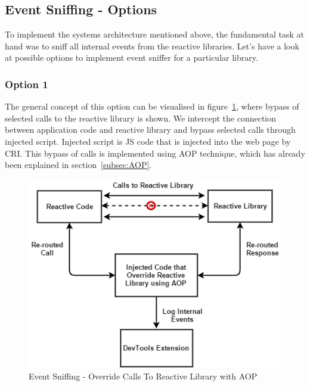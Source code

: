 \subsection{Event Sniffing - Options}
To implement the systems architecture mentioned above, the fundamental task at hand was to sniff all internal events from the reactive libraries. Let's have a look at possible options to implement event sniffer for a particular library.

\subsubsection{Option 1}
The general concept of this option can be visualised in figure~\ref{fig:event_sniffing_1}, where bypass of selected calls to the reactive library is shown. 
We intercept the connection between application code and reactive library and bypass selected calls through injected script. Injected script is JS code that is injected into the web page by CRI. 
This bypass of calls is implemented using AOP technique, which has already been explained in section~\ref{subsec:AOP}.



\begin{figure}[!h]
	\centering
	\includegraphics[scale=0.5,trim=0 0 0 0]{gfx/EventSniffing1.png}
	\caption{Event Sniffing - Override Calls To Reactive Library with AOP}
	\label{fig:event_sniffing_1}
\end{figure}

